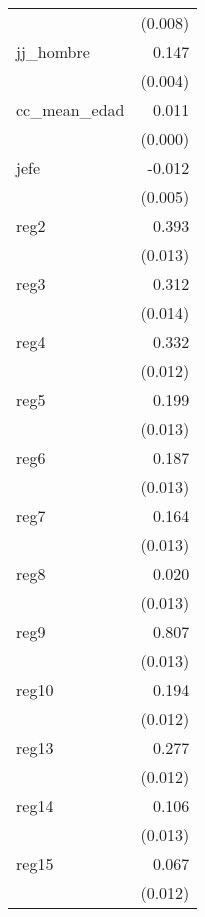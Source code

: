 {\begin{longtable}{l*{1}{D{.}{.}{-1}}}
            &     (0.008)         \\
\addlinespace
jj\_hombre   &       0.147\sym{***}\\
            &     (0.004)         \\
\addlinespace
cc\_mean\_edad&       0.011\sym{***}\\
            &     (0.000)         \\
\addlinespace
jefe        &      -0.012\sym{*}  \\
            &     (0.005)         \\
\addlinespace
reg2        &       0.393\sym{***}\\
            &     (0.013)         \\
\addlinespace
reg3        &       0.312\sym{***}\\
            &     (0.014)         \\
\addlinespace
reg4        &       0.332\sym{***}\\
            &     (0.012)         \\
\addlinespace
reg5        &       0.199\sym{***}\\
            &     (0.013)         \\
\addlinespace
reg6        &       0.187\sym{***}\\
            &     (0.013)         \\
\addlinespace
reg7        &       0.164\sym{***}\\
            &     (0.013)         \\
\addlinespace
reg8        &       0.020         \\
            &     (0.013)         \\
\addlinespace
reg9        &       0.807\sym{***}\\
            &     (0.013)         \\
\addlinespace
reg10       &       0.194\sym{***}\\
            &     (0.012)         \\
\addlinespace
reg13       &       0.277\sym{***}\\
            &     (0.012)         \\
\addlinespace
reg14       &       0.106\sym{***}\\
            &     (0.013)         \\
\addlinespace
reg15       &       0.067\sym{***}\\
            &     (0.012)         \\

\end{longtable}}

